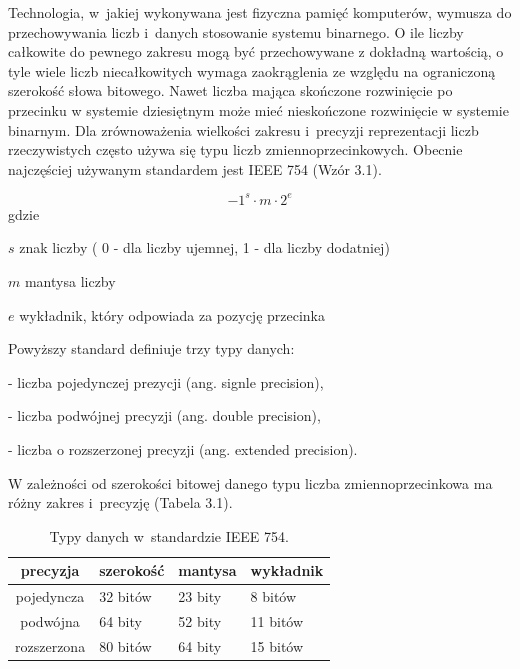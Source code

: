 Technologia, w~jakiej wykonywana jest fizyczna pamięć komputerów, wymusza do przechowywania liczb i~danych stosowanie systemu binarnego. O ile liczby całkowite do pewnego zakresu mogą być przechowywane z dokładną wartością, o tyle wiele liczb niecałkowitych wymaga zaokrąglenia ze względu na ograniczoną szerokość słowa bitowego. Nawet liczba mająca skończone rozwinięcie po przecinku w systemie dziesiętnym może mieć nieskończone rozwinięcie w systemie binarnym. Dla zrównoważenia wielkości zakresu i~precyzji reprezentacji liczb rzeczywistych często używa się typu liczb zmiennoprzecinkowych. Obecnie najczęściej używanym standardem jest IEEE 754 (Wzór 3.1).

\begin{equation}
-1^s\cdot m \cdot 2^e
\end{equation}
gdzie
\begin{eqwhere}[2cm]
        \item[$s$]znak liczby ( 0 - dla liczby ujemnej, 1 - dla liczby dodatniej)
        \item[$m$] mantysa liczby
        \item[$e$] wykładnik, który odpowiada za pozycję przecinka 
\end{eqwhere}

Powyższy standard definiuje trzy typy danych:

- liczba pojedynczej prezycji (ang. signle precision),

- liczba podwójnej precyzji (ang. double precision),

- liczba o rozszerzonej precyzji (ang. extended precision).

W zależności od szerokości bitowej danego typu liczba zmiennoprzecinkowa ma różny zakres i~precyzję (Tabela 3.1).

\begin{table}[H]
        \centering
        \begin{threeparttable}
                \caption{Typy danych w~standardzie IEEE 754.}\label{tab:table_exampleaz}
                \begin{tabularx}{0.6\textwidth}{| c | X | X | X |}
                        \midrule
                        	precyzja	&	szerokość & mantysa & wykładnik \\
\midrule
		pojedyncza  & 32 bitów & 23 bity & 8 bitów \\
                        podwójna  & 64 bity & 52 bity & 11 bitów \\
		rozszerzona & 80 bitów & 64 bity & 15 bitów \\
                        \bottomrule
                \end{tabularx}
        \end{threeparttable}
\end{table}

